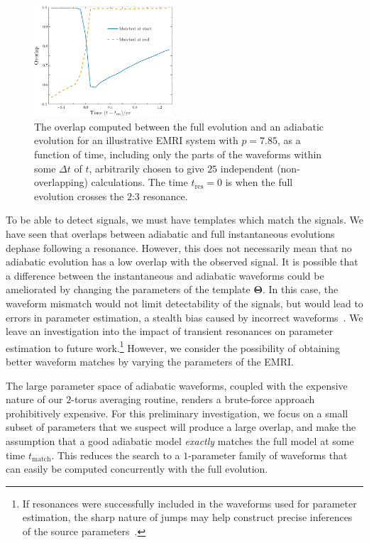 \documentclass[aps,prd,amsfonts,amssymb,amsmath,nofootinbib,showpacs,superscriptaddress,twocolumn,floatfix]{revtex4-1}
\newcommand{\sub}[1]{\ensuremath{_\mathrm{#1}}}
\begin{document}
\begin{figure}
\centering
\includegraphics[width=0.46\textwidth]{Fig_overlap}
\caption{\label{fig:overlap-dephasing}The overlap computed between the full evolution and an adiabatic evolution for an illustrative EMRI system with $p=7.85$, as a function of time, including only the parts of the waveforms within some $\Delta t$ of $t$, arbitrarily chosen to give $25$ independent (non-overlapping) calculations. The time $t\sub{res} = 0$ is when the full evolution crosses the $2$:$3$ resonance.}
\end{figure}

To be able to detect signals, we must have templates which match the signals. We have seen that overlaps between adiabatic and full instantaneous evolutions dephase following a resonance. However, this does not necessarily mean that no adiabatic evolution has a low overlap with the observed signal. It is possible that a difference between the instantaneous and adiabatic waveforms could be ameliorated by changing the parameters of the template $\boldsymbol{\Theta}$. In this case, the waveform mismatch would not limit detectability of the signals, but would lead to errors in parameter estimation, a stealth bias caused by incorrect waveforms~\cite{Cutler2007}. We leave an investigation into the impact of transient resonances on parameter estimation to future work.\footnote{If resonances were successfully included in the waveforms used for parameter estimation, the sharp nature of jumps may help construct precise inferences of the source parameters~\cite{Mandel2014}.} However, we consider the possibility of obtaining better waveform matches by varying the parameters of the EMRI.

The large parameter space of adiabatic waveforms, coupled with the expensive nature of our $2$-torus averaging routine, renders a brute-force approach prohibitively expensive. For this preliminary investigation, we focus on a small subset of parameters that we suspect will produce a large overlap, and make the assumption that a good adiabatic model \emph{exactly} matches the full model at some time $t\sub{match}$. This reduces the search to a $1$-parameter family of waveforms that can easily be computed concurrently with the full evolution.
\end{document}
